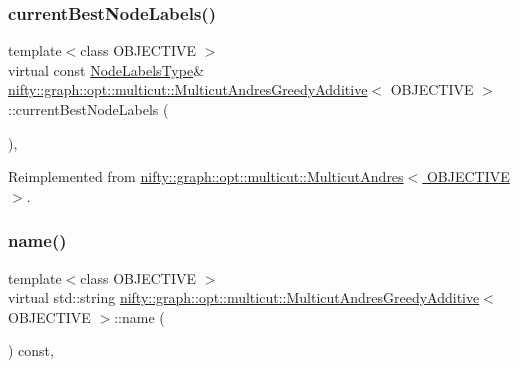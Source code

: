 \subsubsection{\texorpdfstring{current\+Best\+Node\+Labels()}{currentBestNodeLabels()}}
{\footnotesize\ttfamily template$<$class O\+B\+J\+E\+C\+T\+I\+VE $>$ \\
virtual const \hyperlink{classnifty_1_1graph_1_1opt_1_1multicut_1_1MulticutAndres_a6cd9d64abc4a98aa9745ce1ef0d4ecfe}{Node\+Labels\+Type}\& \hyperlink{classnifty_1_1graph_1_1opt_1_1multicut_1_1MulticutAndresGreedyAdditive}{nifty\+::graph\+::opt\+::multicut\+::\+Multicut\+Andres\+Greedy\+Additive}$<$ O\+B\+J\+E\+C\+T\+I\+VE $>$\+::current\+Best\+Node\+Labels (\begin{DoxyParamCaption}{ }\end{DoxyParamCaption})\hspace{0.3cm}{\ttfamily [inline]}, {\ttfamily [virtual]}}



Reimplemented from \hyperlink{classnifty_1_1graph_1_1opt_1_1multicut_1_1MulticutAndres_ad49ef5b1f23c054abb4521445871b9b4}{nifty\+::graph\+::opt\+::multicut\+::\+Multicut\+Andres$<$ O\+B\+J\+E\+C\+T\+I\+V\+E $>$}.

\mbox{\label{classnifty_1_1graph_1_1opt_1_1multicut_1_1MulticutAndresGreedyAdditive_a2e3775af34622f15e57c60986e2d15d4}} 
\subsubsection{\texorpdfstring{name()}{name()}}
{\footnotesize\ttfamily template$<$class O\+B\+J\+E\+C\+T\+I\+VE $>$ \\
virtual std\+::string \hyperlink{classnifty_1_1graph_1_1opt_1_1multicut_1_1MulticutAndresGreedyAdditive}{nifty\+::graph\+::opt\+::multicut\+::\+Multicut\+Andres\+Greedy\+Additive}$<$ O\+B\+J\+E\+C\+T\+I\+VE $>$\+::name (\begin{DoxyParamCaption}{ }\end{DoxyParamCaption}) const\hspace{0.3cm}{\ttfamily [inline]}, {\ttfamily [virtual]}}



